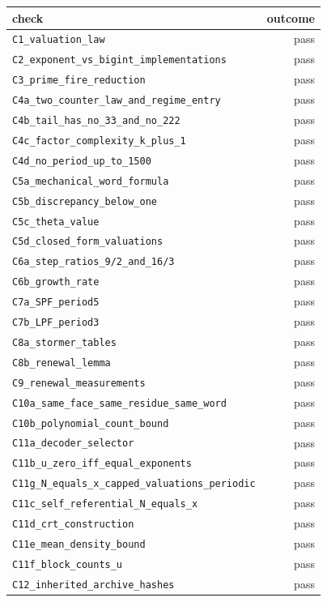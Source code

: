 {\small\begin{longtable}{@{}lr@{}}\toprule
check & outcome\\\midrule\endhead
\texttt{C1\_valuation\_law} & pass \\
\texttt{C2\_exponent\_vs\_bigint\_implementations} & pass \\
\texttt{C3\_prime\_fire\_reduction} & pass \\
\texttt{C4a\_two\_counter\_law\_and\_regime\_entry} & pass \\
\texttt{C4b\_tail\_has\_no\_33\_and\_no\_222} & pass \\
\texttt{C4c\_factor\_complexity\_k\_plus\_1} & pass \\
\texttt{C4d\_no\_period\_up\_to\_1500} & pass \\
\texttt{C5a\_mechanical\_word\_formula} & pass \\
\texttt{C5b\_discrepancy\_below\_one} & pass \\
\texttt{C5c\_theta\_value} & pass \\
\texttt{C5d\_closed\_form\_valuations} & pass \\
\texttt{C6a\_step\_ratios\_9/2\_and\_16/3} & pass \\
\texttt{C6b\_growth\_rate} & pass \\
\texttt{C7a\_SPF\_period5} & pass \\
\texttt{C7b\_LPF\_period3} & pass \\
\texttt{C8a\_stormer\_tables} & pass \\
\texttt{C8b\_renewal\_lemma} & pass \\
\texttt{C9\_renewal\_measurements} & pass \\
\texttt{C10a\_same\_face\_same\_residue\_same\_word} & pass \\
\texttt{C10b\_polynomial\_count\_bound} & pass \\
\texttt{C11a\_decoder\_selector} & pass \\
\texttt{C11b\_u\_zero\_iff\_equal\_exponents} & pass \\
\texttt{C11g\_N\_equals\_x\_capped\_valuations\_periodic} & pass \\
\texttt{C11c\_self\_referential\_N\_equals\_x} & pass \\
\texttt{C11d\_crt\_construction} & pass \\
\texttt{C11e\_mean\_density\_bound} & pass \\
\texttt{C11f\_block\_counts\_u} & pass \\
\texttt{C12\_inherited\_archive\_hashes} & pass \\
\bottomrule\end{longtable}}
